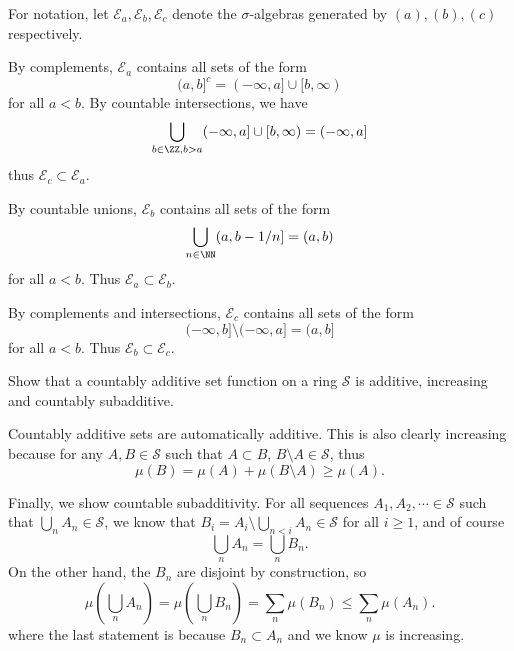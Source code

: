 \documentclass[11pt, headheight=30pt]{scrartcl}
\begin{document}
For notation, let
$\mathcal{E}_a, \mathcal{E}_b, \mathcal{E}_c$ denote the $\sigma$-algebras
generated by $(a), (b), (c)$ respectively.

\begin{psec*}
    By complements, $\mathcal{E}_a$ contains all sets of the form
    \[
        (a,b]^c = (-\infty, a] \cup [b, \infty)
    \]
    for all $a < b$. By countable intersections, we have
    \[
        \bigcup_{b\in \ZZ, b > a} (-\infty, a] \cup [b, \infty) = (-\infty, a]  
    \]
    thus $\mathcal{E}_c\subset \mathcal{E}_a$.
\end{psec*}

\begin{psec*}
    By countable unions, $\mathcal{E}_b$ contains all sets of the form
    \[
        \bigcup_{n\in \NN} (a, b - 1/n] = (a,b)
    \]
    for all $a < b$. Thus $\mathcal{E}_a\subset \mathcal{E}_b$.
\end{psec*}

\begin{psec*}
    By complements and intersections, $\mathcal{E}_c$ contains all sets of the form
    \[
        (-\infty, b] \setminus (-\infty, a] = (a,b]
    \]
    for all $a < b$. Thus $\mathcal{E}_b\subset \mathcal{E}_c$.
\end{psec*}


\pagebreak
\begin{prob*}
    Show that a countably additive set function on a ring $\mathcal{S}$
    is additive, increasing and countably subadditive.
\end{prob*}

Countably additive sets are automatically
additive. This is also clearly increasing because
for any $A, B\in \mathcal{S}$ such that $A\subset B$,
$B\setminus A\in \mathcal{S}$, thus
\[
    \mu\left(B\right) = \mu\left(A\right) + \mu\left(B\setminus A\right)
    \geq \mu\left(A\right).    
\]

Finally, we show countable subadditivity. For all sequences
$A_1, A_2, \cdots \in \mathcal{S}$
such that $\bigcup_n A_n \in \mathcal{S}$, we know that
$B_i = A_i \setminus \bigcup_{n < i} A_n \in \mathcal{S}$
for all $i\geq 1$, and of course
\[
    \bigcup_n A_n = \bigcup_n B_n.    
\]
On the other hand, the $B_n$ are disjoint by construction, so
\[
    \mu\left(\bigcup_n A_n\right) = \mu\left(\bigcup_n B_n\right)
    = \sum_n \mu\left(B_n\right) \leq \sum_n \mu\left(A_n\right).
\]
where the last statement is because $B_n\subset A_n$
and we know $\mu$ is increasing.
\end{document}
